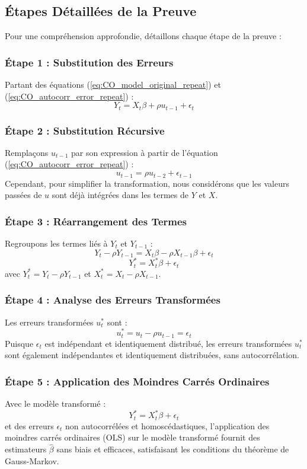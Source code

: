 \documentclass[14pt]{extarticle} %
\theoremstyle{definition}
\theoremstyle{plain}
\begin{document}
\subsection{Étapes Détaillées de la Preuve}
Pour une compréhension approfondie, détaillons chaque étape de la preuve :

\subsubsection{Étape 1 : Substitution des Erreurs}
Partant des équations (\ref{eq:CO_model_original_repeat}) et (\ref{eq:CO_autocorr_error_repeat}) :
\[
Y_t = X_t \beta + \rho u_{t-1} + \epsilon_t
\]

\subsubsection{Étape 2 : Substitution Récursive}
Remplaçons \( u_{t-1} \) par son expression à partir de l'équation (\ref{eq:CO_autocorr_error_repeat}) :
\[
u_{t-1} = \rho u_{t-2} + \epsilon_{t-1}
\]
Cependant, pour simplifier la transformation, nous considérons que les valeurs passées de \( u \) sont déjà intégrées dans les termes de \( Y \) et \( X \).

\subsubsection{Étape 3 : Réarrangement des Termes}
Regroupons les termes liés à \( Y_t \) et \( Y_{t-1} \) :
\[
Y_t - \rho Y_{t-1} = X_t \beta - \rho X_{t-1} \beta + \epsilon_t
\]
\[
Y_t^* = X_t^* \beta + \epsilon_t
\]
avec \( Y_t^* = Y_t - \rho Y_{t-1} \) et \( X_t^* = X_t - \rho X_{t-1} \).

\subsubsection{Étape 4 : Analyse des Erreurs Transformées}
Les erreurs transformées \( u_t^* \) sont :
\[
u_t^* = u_t - \rho u_{t-1} = \epsilon_t
\]
Puisque \( \epsilon_t \) est indépendant et identiquement distribué, les erreurs transformées \( u_t^* \) sont également indépendantes et identiquement distribuées, sans autocorrélation.

\subsubsection{Étape 5 : Application des Moindres Carrés Ordinaires}
Avec le modèle transformé :
\[
Y_t^* = X_t^* \beta + \epsilon_t
\]
et des erreurs \( \epsilon_t \) non autocorrélées et homoscédastiques, l'application des moindres carrés ordinaires (OLS) sur le modèle transformé fournit des estimateurs \( \hat{\beta} \) sans biais et efficaces, satisfaisant les conditions du théorème de Gauss-Markov.
\end{document}

